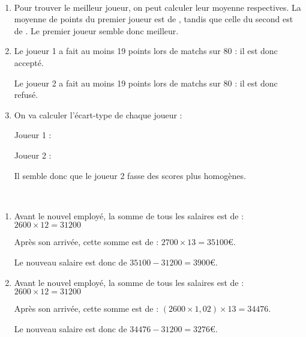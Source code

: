 \documentclass[
	classe=$2^{de}$,
	headerTitle=Évaluation\space Chapitre\space 4
]{évaluation}
\begin{document}
\begin{exercice}\

	\begin{enumerate}
		\item Pour trouver le meilleur joueur, on peut calculer leur moyenne respectives. La moyenne de points du premier joueur est de , tandis que celle du second est de . Le premier joueur semble donc meilleur.
		\item Le joueur 1 a fait au moins 19 points lors de  matchs sur 80 : il est donc accepté.

		      Le joueur 2 a fait au moins 19 points lors de  matchs sur 80 : il est donc refusé.
		\item On va calculer l'écart-type de chaque joueur :

		      Joueur 1 : 

		      Joueur 2 : 

		      Il semble donc que le joueur 2 fasse des scores plus homogènes.
	\end{enumerate}
\end{exercice}

\begin{exercice}\

	\begin{enumerate}
		\item Avant le nouvel employé, la somme de tous les salaires est de : $2600×12 = 31200$

		      Après son arrivée, cette somme est de : $2700×13 = 35100€$.

		      Le nouveau salaire est donc de $35100-31200 = 3900€$.
		\item Avant le nouvel employé, la somme de tous les salaires est de : $2600×12 = 31200$

		      Après son arrivée, cette somme est de : $(2600×1,02)×13 = 34476$.

		      Le nouveau salaire est donc de $34476-31200 = 3276€$.
	\end{enumerate}
\end{exercice}
\end{document}
